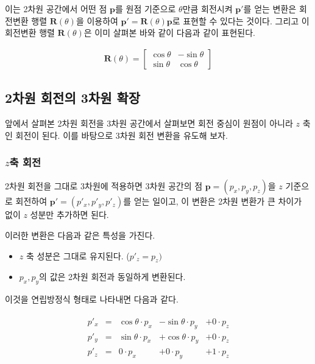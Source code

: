 이는 2차원 공간에서 어떤 점 $\mathbf p$를 원점 기준으로 $\theta$만큼 회전시켜 $\mathbf p'$를 얻는 변환은 회전변환 행렬 $\mathbf R(\theta)$을
이용하여 $\mathbf p' = \mathbf R(\theta) \mathbf p$로 표현할 수 있다는 것이다. 그리고 이 회전변환 행렬 $\mathbf R(\theta)$은 이미 살펴본 바와 같이
다음과 같이 표현된다.

\begin{eqnarray}
\mathbf R(\theta) = \left [ 
\begin{array}{cc}
\cos \theta & - \sin \theta \\
\sin \theta & \cos \theta
\end{array}
\right ]
\label{eq:rotationMatrix2D}
\end{eqnarray} 

\subsection{2차원 회전의 3차원 확장}

앞에서 살펴본 2차원 회전을 3차원 공간에서 살펴보면 회전 중심이 원점이 아니라 $z$ 축인 회전이 된다. 이를 바탕으로 3차원 회전 변환을 유도해 보자.

\subsubsection{$z$축 회전}

2차원 회전을 그대로 3차원에 적용하면 
3차원 공간의 점 $\mathbf p = (p_x, p_y, p_z)$을 $z$ 기준으로 회전하여 $\mathbf p' = (p'_x, p'_y, p'_z)$를 얻는 일이고,
이 변환은 2차원 변환가 큰 차이가 없이 $z$ 성분만 추가하면 된다.

이러한 변환은 다음과 같은 특성을 가진다.
\begin{itemize}
\item $z$ 축 성분은 그대로 유지된다. ($p'_z = p_z)$
\item $p_x, p_y$의 값은 2차원 회전과 동일하게 변환된다.
\end{itemize}

이것을 연립방정식 형태로 나타내면 다음과 같다.

\begin{eqnarray}
\begin{array}{clrrr}
p'_x  & = &\cos \theta \cdot p_x &- \sin \theta \cdot p_y &+ 0 \cdot p_z \\
p'_y  & = &\sin \theta \cdot p_x &+ \cos \theta \cdot p_y &+ 0 \cdot p_z \\
p'_z  & = & 0 \cdot p_x &+ 0 \cdot p_y &+ 1 \cdot p_z
\end{array}
\end{eqnarray}

